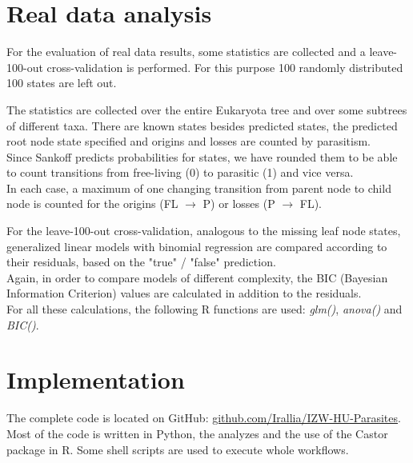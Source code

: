   \section{Real data analysis} \label{sec:methods - real data analysis}
    For the evaluation of real data results, some statistics are collected and a leave-100-out 
      cross-validation is performed. For this purpose 100 randomly distributed 100 states are left out.

    The statistics are collected over the entire Eukaryota tree and over some subtrees of different 
      taxa. There are known states besides predicted states, the predicted root node state specified 
      and origins and losses are counted by parasitism. \\
    Since Sankoff predicts probabilities for states, we have rounded them to be able to count 
      transitions from free-living (0) to parasitic (1) and vice versa. \\
    In each case, a maximum of one changing transition from parent node to child node is counted for 
      the origins (FL $\rightarrow$ P) or losses (P $\rightarrow$ FL).
    
    For the leave-100-out cross-validation, analogous to the missing leaf node states, generalized 
      linear models with binomial regression are compared according to their residuals, based on the 
      "true" / "false" prediction. \\
    Again, in order to compare models of different complexity, the BIC (Bayesian Information Criterion) 
      values are calculated in addition to the residuals. \\
    For all these calculations, the following R functions are used: \textit{glm()}, \textit{anova()} 
      and \textit{BIC()}. \\

  \section{Implementation}
    The complete code is located on GitHub: 
      \hyperlink{github.com/Irallia/IZW-HU-Parasites}{github.com/Irallia/IZW-HU-Parasites}. \\
    Most of the code is written in Python, the analyzes and the use of the Castor package in R. Some 
      shell scripts are used to execute whole workflows.

